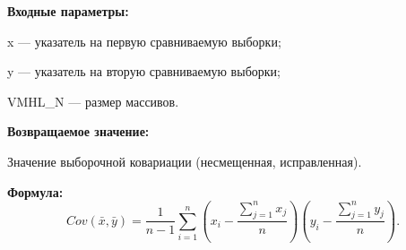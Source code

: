\textbf{Входные параметры:}
 
x --- указатель на первую сравниваемую выборки;
 
y --- указатель на вторую сравниваемую выборки;
 
VMHL\_N --- размер массивов.

\textbf{Возвращаемое значение:}
 
Значение выборочной ковариации (несмещенная, исправленная).

\textbf{Формула:}
\begin{equation*}
Cov\left(\bar{x},\bar{y} \right)= \dfrac{1}{n-1}\sum_{i=1}^{n} \left( x_i-\dfrac{\sum_{j=1}^{n}x_j}{n}\right)\left( y_i-\dfrac{\sum_{j=1}^{n}y_j}{n}\right) .
\end{equation*}
